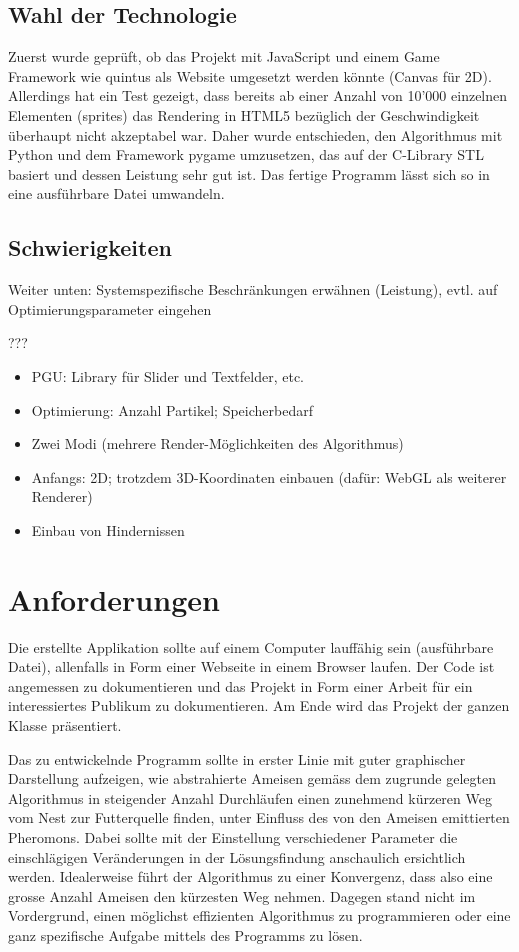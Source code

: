 \subsection{Wahl der Technologie}

Zuerst wurde geprüft, ob das Projekt mit JavaScript und einem Game Framework wie quintus als Website umgesetzt werden könnte (Canvas für 2D). Allerdings hat ein Test gezeigt, dass bereits ab einer Anzahl von 10'000 einzelnen Elementen (sprites) das Rendering in HTML5 bezüglich der Geschwindigkeit überhaupt nicht akzeptabel war. Daher wurde entschieden, den Algorithmus mit Python und dem Framework pygame umzusetzen, das auf der C-Library STL basiert und dessen Leistung sehr gut ist. Das fertige Programm lässt sich so in eine ausführbare Datei umwandeln.

\subsection{Schwierigkeiten}

Weiter unten: Systemspezifische Beschränkungen erwähnen (Leistung), evtl. auf Optimierungsparameter eingehen

???
\begin{itemize}[noitemsep]
\item PGU: Library für Slider und Textfelder, etc.
\item Optimierung: Anzahl Partikel; Speicherbedarf
\item Zwei Modi (mehrere Render-Möglichkeiten des Algorithmus)
\item Anfangs: 2D; trotzdem 3D-Koordinaten einbauen (dafür: WebGL als weiterer Renderer)
\item Einbau von Hindernissen
\end{itemize}




\section{Anforderungen}

Die erstellte Applikation sollte auf einem Computer lauffähig sein (ausführbare Datei), allenfalls in Form einer Webseite in einem Browser laufen. Der Code ist angemessen zu dokumentieren und das Projekt in Form einer Arbeit für ein interessiertes Publikum zu dokumentieren. Am Ende wird das Projekt der ganzen Klasse präsentiert.

Das zu entwickelnde Programm sollte in erster Linie mit guter graphischer Darstellung aufzeigen, wie abstrahierte Ameisen gemäss dem zugrunde gelegten Algorithmus in steigender Anzahl Durchläufen einen zunehmend kürzeren Weg vom Nest zur Futterquelle finden, unter Einfluss des von den Ameisen emittierten Pheromons. Dabei sollte mit der Einstellung verschiedener Parameter die einschlägigen Veränderungen in der Lösungsfindung anschaulich ersichtlich werden. Idealerweise führt der Algorithmus zu einer Konvergenz, dass also eine grosse Anzahl Ameisen den kürzesten Weg nehmen. Dagegen stand nicht im Vordergrund, einen möglichst effizienten Algorithmus zu programmieren oder eine ganz spezifische Aufgabe mittels des Programms zu lösen.


